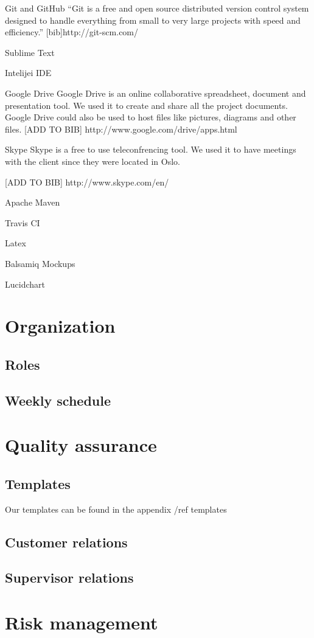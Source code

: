 Git and GitHub
``Git is a free and open source distributed version control system designed to handle everything from small to very large projects with speed and efficiency.''
[bib]http://git-scm.com/

Sublime Text 

Intelijei IDE

Google Drive
Google Drive is an online collaborative spreadsheet, document and presentation tool. We used it to create and share all the project documents. Google Drive could also be used to host files like pictures, diagrams and other files.
[ADD TO BIB]
http://www.google.com/drive/apps.html


Skype 
Skype is a free to use teleconfrencing tool. We used it to have meetings with the client since they were located in Oslo.

[ADD TO BIB]
http://www.skype.com/en/

Apache Maven

Travis CI

Latex

Balsamiq Mockups

Lucidchart


\section{Organization}
\subsection{Roles}
\subsection{Weekly schedule}

\section{Quality assurance}
\subsection{Templates}

Our templates can be found in the appendix /ref templates
\subsection{Customer relations}
\subsection{Supervisor relations}


\section{Risk management}